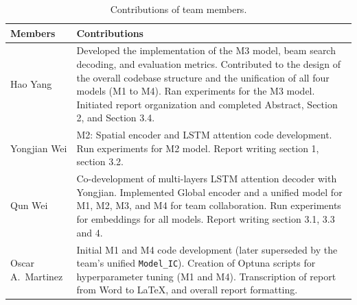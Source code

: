 \documentclass[10pt,twocolumn,letterpaper]{article}
\begin{document}
\begin{table}[H]
\begin{center}
\small
\begin{tabular}{@{}lp{5.5cm}@{}}
\toprule
Members & Contributions \\
\midrule
Hao Yang & Developed the implementation of the M3 model, beam search decoding, and evaluation metrics. 
   Contributed to the design of the overall codebase structure and the unification of all four models (M1 to M4). 
   Ran experiments for the M3 model. 
   Initiated report organization and completed Abstract, Section 2, and Section 3.4. \\
Yongjian Wei & 
  M2: Spatial encoder and LSTM attention code development.
  Run experiments for M2 model.
  Report writing section 1, section 3.2. \\
Qun Wei & 
  Co-development of multi-layers LSTM attention decoder with Yongjian.
  Implemented Global encoder and a unified model for M1, M2, M3, and M4 for team collaboration.
  Run experiments for embeddings for all models.
  Report writing section 3.1, 3.3 and 4. \\
Oscar A.~Martinez &
  Initial M1 and M4 code development (later superseded by the team's unified \texttt{Model\_IC}).
  Creation of Optuna scripts for hyperparameter tuning (M1 and M4).
  Transcription of report from Word to \LaTeX, and overall report formatting. \\
\bottomrule
\end{tabular}
\caption{\footnotesize Contributions of team members.}
\label{tab:contributions}
\end{center}
\end{table}


{\small


}
\end{document}
